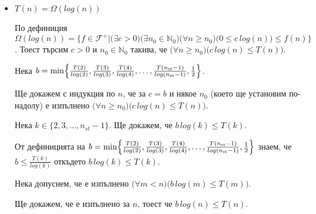 \begin{solution}
\begin{itemize}
		\vspace{0.35cm}
		\item $T(n)=\Omega(log(n))$
		
		По $\hyperref[bdef-asymp-classes]{\text{дефиниция}}$ $\Omega(log(n))\!=\!\{f\in\mathscr{F}^+|\big(\exists c>0\big)\big(\exists n_0\in\mathbb{N}_0\big)\big(\forall n\ge n_0\big)\big(0\le c\,log(n)\big)\le f(n)\}$. Тоест търсим $c>0$ и $n_0\in\mathbb{N}_0$ такива, че $\big(\forall n\ge n_0\big)\big(c\,log(n)\le T(n)\big)$.
		
		Нека $b=\min\Bigl\{\frac{T(2)}{log(2)},\frac{T(3)}{log(3)},\frac{T(4)}{log(4)},\dots,\frac{T(n_{\text{st}}-1)}{log({n_{\text{st}}-1)}},\frac12\Bigr\}$.%
		
		Ще докажем с индукция по $n$, че за $c=b$ и някое $n_0$ (което ще установим по-надолу) е изпълнено $\big(\forall n\ge n_0\big)\big(c\,log(n)\le T(n)\big)$.
		
		\begin{base}
			Нека $k\in\{2,3,\dots,n_{st}-1\}$. Ще докажем, че $b\,log(k)\le T(k)$.
			
			От дефиницията на $b=\min\Bigl\{\frac{T(2)}{log(2)},\frac{T(3)}{log(3)},\frac{T(4)}{log(4)},\dots,\frac{T(n_{\text{st}}-1)}{log({n_{\text{st}}-1)}},\frac12\Bigr\}$ знаем, че $b\le \frac{T(k)}{log(k)}$ откъдето $b\,log(k)\le T(k)$.
		\end{base}
		
		\begin{indhypothesis}
			Нека допуснем, че е изпълнено $\big(\forall m<n\big)\big(b\,log(m)\le T(m)\big)$.
		\end{indhypothesis}
		
		\begin{indstep}
			Ще докажем, че е изпълнено за $n$, тоест че $b\,log(n)\le T(n)$.
			

\end{indstep}
\end{itemize}
\end{solution}
